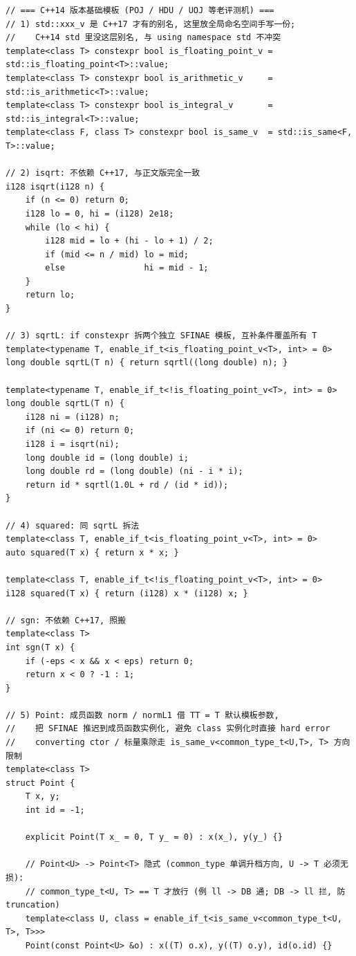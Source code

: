 	\begin{verbatim}
// === C++14 版本基础模板 (POJ / HDU / UOJ 等老评测机) ===
// 1) std::xxx_v 是 C++17 才有的别名, 这里放全局命名空间手写一份;
//    C++14 std 里没这层别名, 与 using namespace std 不冲突
template<class T> constexpr bool is_floating_point_v = std::is_floating_point<T>::value;
template<class T> constexpr bool is_arithmetic_v     = std::is_arithmetic<T>::value;
template<class T> constexpr bool is_integral_v       = std::is_integral<T>::value;
template<class F, class T> constexpr bool is_same_v  = std::is_same<F, T>::value;

// 2) isqrt: 不依赖 C++17, 与正文版完全一致
i128 isqrt(i128 n) {
	if (n <= 0) return 0;
	i128 lo = 0, hi = (i128) 2e18;
	while (lo < hi) {
		i128 mid = lo + (hi - lo + 1) / 2;
		if (mid <= n / mid) lo = mid;
		else                hi = mid - 1;
	}
	return lo;
}

// 3) sqrtL: if constexpr 拆两个独立 SFINAE 模板, 互补条件覆盖所有 T
template<typename T, enable_if_t<is_floating_point_v<T>, int> = 0>
long double sqrtL(T n) { return sqrtl((long double) n); }

template<typename T, enable_if_t<!is_floating_point_v<T>, int> = 0>
long double sqrtL(T n) {
	i128 ni = (i128) n;
	if (ni <= 0) return 0;
	i128 i = isqrt(ni);
	long double id = (long double) i;
	long double rd = (long double) (ni - i * i);
	return id * sqrtl(1.0L + rd / (id * id));
}

// 4) squared: 同 sqrtL 拆法
template<class T, enable_if_t<is_floating_point_v<T>, int> = 0>
auto squared(T x) { return x * x; }

template<class T, enable_if_t<!is_floating_point_v<T>, int> = 0>
i128 squared(T x) { return (i128) x * (i128) x; }

// sgn: 不依赖 C++17, 照搬
template<class T>
int sgn(T x) {
	if (-eps < x && x < eps) return 0;
	return x < 0 ? -1 : 1;
}

// 5) Point: 成员函数 norm / normL1 借 TT = T 默认模板参数,
//    把 SFINAE 推迟到成员函数实例化, 避免 class 实例化时直接 hard error
//    converting ctor / 标量乘除走 is_same_v<common_type_t<U,T>, T> 方向限制
template<class T>
struct Point {
	T x, y;
	int id = -1;

	explicit Point(T x_ = 0, T y_ = 0) : x(x_), y(y_) {}

	// Point<U> -> Point<T> 隐式 (common_type 单调升档方向, U -> T 必须无损):
	// common_type_t<U, T> == T 才放行 (例 ll -> DB 通; DB -> ll 拦, 防 truncation)
	template<class U, class = enable_if_t<is_same_v<common_type_t<U, T>, T>>>
	Point(const Point<U> &o) : x((T) o.x), y((T) o.y), id(o.id) {}


\end{verbatim}
